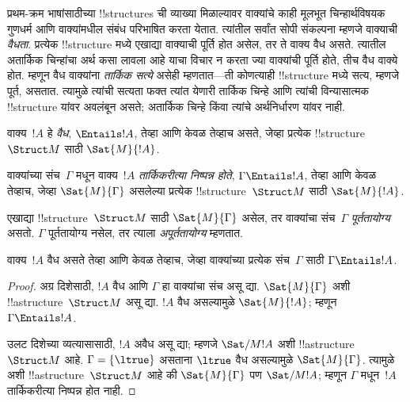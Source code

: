 \documentclass[../../../include/open-logic-section]{subfiles}
\begin{document}

\begin{explain}
प्रथम-क्रम भाषांसाठीच्या !!{structure}s ची व्याख्या मिळाल्यावर वाक्यांचे
काही मूलभूत चिन्हार्थविषयक गुणधर्म आणि वाक्यांमधील संबंध परिभाषित करता
येतात. त्यांतील सर्वांत सोपी संकल्पना म्हणजे वाक्याची \emph{वैधता}.
प्रत्येक !!{structure} मध्ये एखाद्या वाक्याची पूर्ति होत असेल, तर ते
वाक्य वैध असते. त्यातील अतार्किक चिन्हांचा अर्थ कसा लावला आहे याचा
विचार न करता ज्या वाक्यांची पूर्ति होते, तीच वैध वाक्ये होत. म्हणून वैध
वाक्यांना \emph{तार्किक सत्ये} असेही म्हणतात---ती कोणत्याही
!!{structure} मध्ये सत्य, म्हणजे पूर्त, असतात. त्यामुळे त्यांची सत्यता
फक्त त्यांत येणारी तार्किक चिन्हे आणि त्यांची विन्यासात्मक !!{structure}
यांवर अवलंबून असते; अतार्किक चिन्हे किंवा त्यांचे अर्थनिर्धारण यांवर नाही.
\end{explain}

\begin{defn}[वैधता]
वाक्य~$!A$ हे \emph{वैध}, $\Entails !A$, तेव्हा आणि केवळ तेव्हाच असते,
जेव्हा प्रत्येक !!{structure}~$\Struct M$ साठी $\Sat{M}{!A}$.
\end{defn}

\begin{defn}[तार्किक निष्पन्नता]
वाक्यांच्या संच~$\Gamma$ मधून वाक्य~$!A$
\emph{तार्किकरीत्या निष्पन्न होते}, $\Gamma \Entails !A$, तेव्हा आणि
केवळ तेव्हाच, जेव्हा $\Sat{M}{\Gamma}$ असलेल्या प्रत्येक
!!{structure}~$\Struct M$ साठी $\Sat{M}{!A}$.
\end{defn}


\begin{defn}[पूर्ततायोग्यता]
एखाद्या !!{structure}~$\Struct M$ साठी $\Sat{M}{\Gamma}$ असेल, तर
वाक्यांचा संच~$\Gamma$ \emph{पूर्ततायोग्य} असतो. $\Gamma$
पूर्ततायोग्य नसेल, तर त्याला \emph{अपूर्ततायोग्य} म्हणतात.
\end{defn}

\begin{prop}
वाक्य~$!A$ वैध असते तेव्हा आणि केवळ तेव्हाच, जेव्हा
वाक्यांच्या प्रत्येक संच~$\Gamma$ साठी $\Gamma \Entails !A$.
\end{prop}

\begin{proof}
अग्र दिशेसाठी, $!A$ वैध आणि $\Gamma$ हा वाक्यांचा संच असू द्या.
$\Sat{M}{\Gamma}$ अशी !!a{structure}~$\Struct M$ असू द्या. $!A$ वैध
असल्यामुळे $\Sat{M}{!A}$; म्हणून $\Gamma \Entails !A$.

उलट दिशेच्या व्यत्यासासाठी, $!A$ अवैध असू द्या; म्हणजे
$\Sat/{M}{!A}$ अशी !!a{structure}~$\Struct M$ आहे. $\Gamma =
\{ \ltrue \}$ असताना $\ltrue$ वैध असल्यामुळे $\Sat{M}{\Gamma}$.
त्यामुळे अशी !!a{structure}~$\Struct M$ आहे की $\Sat{M}{\Gamma}$ पण
$\Sat/{M}{!A}$; म्हणून $\Gamma$ मधून~$!A$ तार्किकरीत्या निष्पन्न होत
नाही.
\end{proof}
\end{document}
